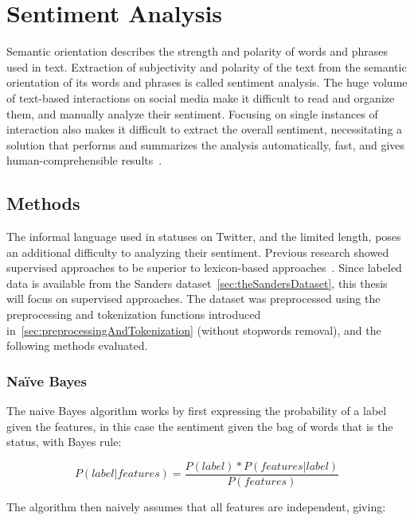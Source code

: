 \chapter{Sentiment Analysis}
\label{ch:sentimentAnalysis}

Semantic orientation describes the strength and polarity of words and phrases used in text.
Extraction of subjectivity and polarity of the text from the semantic orientation of its words and phrases is called sentiment analysis.
The huge volume of text-based interactions on social media make it difficult
to read and organize them, and manually analyze their sentiment.
Focusing on single instances of interaction also makes it difficult to extract the overall sentiment,
necessitating a solution that performs and summarizes the analysis automatically, fast, and gives human-comprehensible results~\cite{Sarlan2014}.

\section{Methods}
\label{sec:methods_sa}

The informal language used in statuses on Twitter, and the limited length, poses an additional difficulty
to analyzing their sentiment.
Previous research showed supervised approaches to be superior to lexicon-based approaches~\cite{Sarlan2014}.
Since labeled data is available from the Sanders dataset~\autoref{sec:theSandersDataset},
this thesis will focus on supervised approaches.
The dataset was preprocessed using the preprocessing and tokenization functions introduced in~\autoref{sec:preprocessingAndTokenization} (without stopwords removal),
and the following methods evaluated.

\subsection{Na\"{i}ve Bayes}
\label{subsec:naivebayes}

The naive Bayes algorithm works by first expressing the probability of a label given the features,
in this case the sentiment given the bag of words that is the status, with Bayes rule:

\begin{equation}
    P(label|features) = \frac{P(label)*P(features|label)}{P(features)}
\end{equation}

The algorithm then naively assumes that all features are independent, giving:

